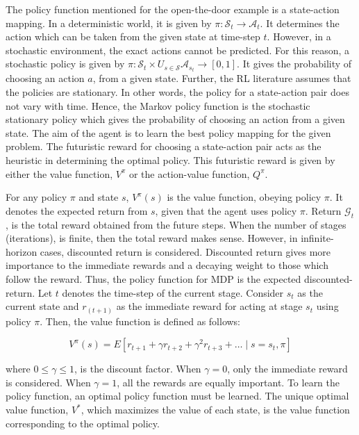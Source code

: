 The policy function mentioned for the open-the-door example is a state-action mapping. In a deterministic world, it is given by \(\pi:\mathcal{S}_t \rightarrow \mathcal{A}_t\). It determines the action which can be taken from the given state at time-step \(t\). However, in a stochastic environment, the exact actions cannot be predicted. For this reason, a stochastic policy is given by \(\pi:\mathcal{S}_t \times U_{s \in \mathcal{S}} \mathcal{A}_{s_t} \rightarrow [0,1]\). It gives the probability of choosing an action \(a\), from a given state. Further, the RL literature assumes that the policies are stationary. In other words, the policy for a state-action pair does not vary with time. Hence, the Markov policy function is the stochastic stationary policy which gives the probability of choosing an action from a given state. The aim of the agent is to learn the best policy mapping for the given problem. The futuristic reward for choosing a state-action pair acts as the heuristic in determining the optimal policy. This futuristic reward is given by either the value function, \(V^\pi\) or the action-value function, \(Q^\pi\).  

For any policy \(\pi\) and state \(s\), \(V^\pi (s)\) is the value function, obeying policy \(\pi\). It denotes the expected return from \(s\), given that the agent uses policy \(\pi\). Return \(\mathcal{G}_t\), is the total reward obtained from the future steps. When the number of stages (iterations), is finite, then the total reward makes sense. However, in infinite-horizon cases, discounted return is considered. Discounted return gives more importance to the immediate rewards and a decaying weight to those which follow the reward. Thus, the policy function for MDP is the expected discounted-return. Let \(t\) denotes the time-step of the current stage. Consider \(s_t\) as the current state and \(r_(t+1)\) as the immediate reward for acting at stage \(s_t\) using policy \(\pi\). Then, the value function is defined as follows:

\begin{equation}
    V^\pi (s)=E[r_{t+1}+\gamma r_{t+2}+ \gamma^2 r_{t+3} + \dots \mid s=s_t,\pi]
\end{equation}

where \(0 \leq \gamma  \leq 1\), is the discount factor. When \(\gamma=0\), only the immediate reward is considered. When \(\gamma=1\), all the rewards are equally important. To learn the policy function, an optimal policy function must be learned. The unique optimal value function, \(V^*\), which maximizes the value of each state, is the value function corresponding to the optimal policy. 

